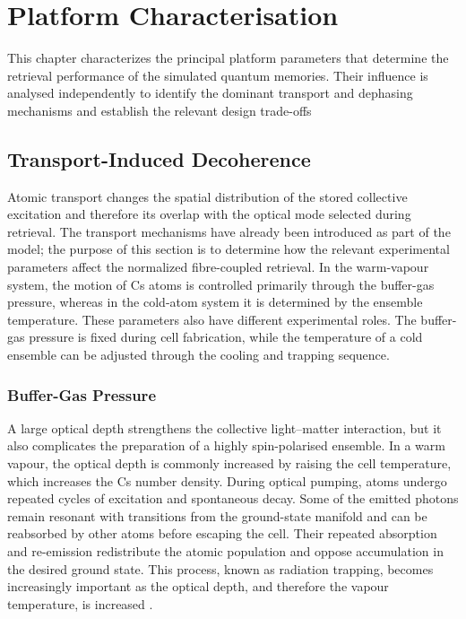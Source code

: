 \chapter{Platform Characterisation}
\label{chap:simulation_results}

This chapter characterizes the principal platform parameters that determine the retrieval performance of the simulated quantum memories. Their influence is analysed independently to identify the dominant transport and dephasing mechanisms and establish the relevant design trade-offs

\section{Transport-Induced Decoherence}
\label{sec:transport_dynamics}
\newcommand{\nitrogen}{\ensuremath{\mathrm{N_2}} }

Atomic transport changes the spatial distribution of the stored collective excitation and therefore its overlap with the optical mode selected during retrieval. The transport mechanisms have already been introduced as part of the model; the purpose of this section is to determine how the relevant experimental parameters affect the normalized fibre-coupled retrieval. In the warm-vapour system, the motion of Cs atoms is controlled primarily through the buffer-gas pressure, whereas in the cold-atom system it is determined by the ensemble temperature. These parameters also have different experimental roles. The buffer-gas pressure is fixed during cell fabrication, while the temperature of a cold ensemble can be adjusted through the cooling and trapping sequence.

\subsection{Buffer-Gas Pressure}
\label{sec:results_buffer_gas_pressure}

A large optical depth strengthens the collective light--matter interaction, but it also complicates the preparation of a highly spin-polarised ensemble. In a warm vapour, the optical depth is commonly increased by raising the cell temperature, which increases the Cs number density. During optical pumping, atoms undergo repeated cycles of excitation and spontaneous decay. Some of the emitted photons remain resonant with transitions from the ground-state manifold and can be reabsorbed by other atoms before escaping the cell. Their repeated absorption and re-emission redistribute the atomic population and oppose accumulation in the desired ground state. This process, known as radiation trapping, becomes increasingly important as the optical depth, and therefore the vapour temperature, is increased \cite{HeRmbsrt_ThomasEtAl_2017}.

